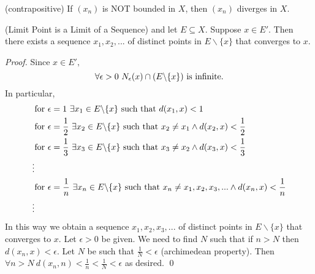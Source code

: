 \documentclass[a4paper]{article}
\begin{document}
     \begin{corollary} (contrapositive)
        If $(x_n)$ is NOT bounded in $X$, then $(x_n)$ diverges in $X$.
     \end{corollary}

     \begin{theorem}(Limit Point is a Limit of a Sequence)
        \routineMS and let $E\subseteq X$. Suppose $x \in E'$. Then there exists a sequence $x_1, x_2, ...$ of distinct points in $E \backslash \{x\}$ that converges to $x$.
     \end{theorem}
     \begin{proof}
        Since $x\in E',$
        $$\forall \epsilon > 0 ~N_{\epsilon}(x) \cap (E \backslash \{x\}) \text{ is infinite.}$$
        In particular,
        \begin{align*}
            &\text{for } \epsilon = 1 ~\exists x_1 \in E \backslash \{x\} \text{ such that } d(x_1, x) < 1 \\
            &\text{for } \epsilon = \frac{1}{2} ~\exists x_2 \in E \backslash \{x\} \text{ such that } x_2 \not = x_1 \wedge d(x_2, x) < \frac{1}{2} \\
            &\text{for } \epsilon = \frac{1}{3} ~\exists x_3 \in E \backslash \{x\} \text{ such that } x_3 \not = x_2 \wedge d(x_3, x) < \frac{1}{3} \\
            \vdots \\
            &\text{for } \epsilon = \frac{1}{n} ~\exists x_n \in E \backslash \{x\} \text{ such that } x_n \not = x_1, x_2, x_3,... \wedge d(x_n, x) < \frac{1}{n} \\
            \vdots
        \end{align*}
        In this way we obtain a sequence $x_1, x_2, x_3,...$ of distinct points in $E \backslash \{x\}$ that converges to $x$.
        Let $\epsilon > 0$ be given. We need to find $N$ such that if $n > N$ then $d(x_n, x) < \epsilon$. Let $N$ be such that $\frac{1}{N} < \epsilon$ (archimedean property). Then $\forall n > N ~d(x_n, n) < \frac{1}{n} < \frac{1}{N} < \epsilon$ as desired. \qed
     \end{proof}
\end{document}
